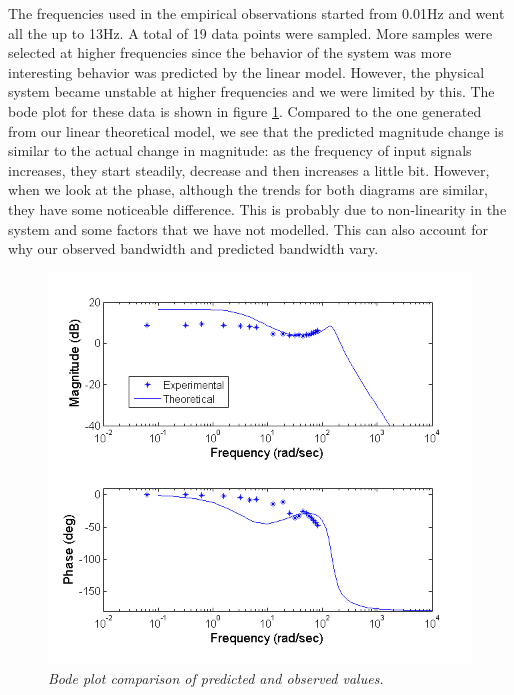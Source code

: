\documentclass{article}
\theoremstyle{plain}
\theoremstyle{definition}
\theoremstyle{remark}
\begin{document}
The frequencies used in the empirical observations started from 0.01Hz and went all the up to 13Hz. A total of 19 data points were sampled. More samples were selected at higher frequencies since the behavior of the system was more interesting behavior was predicted by the linear model. However, the physical system became unstable at higher frequencies and we were limited by this. The bode plot for these data is shown in figure \ref{Q3_1}. Compared to the one generated from our linear theoretical model, we see that the predicted magnitude change is similar to the actual change in magnitude: as the frequency of input signals increases, they start steadily, decrease and then increases a little bit. However, when we look at the phase, although the trends for both diagrams are similar, they have some noticeable difference. This is probably due to non-linearity in the system and some factors that we have not modelled. This can also account for why our observed bandwidth and predicted bandwidth vary.

\begin{figure}[htb]
\begin{center}
\includegraphics[width = 15cm]{BodeComparison.png}
\caption{\emph{Bode plot comparison of predicted and observed values.}}
\label{Q3_1}
\end{center}
\end{figure}
\end{document}
